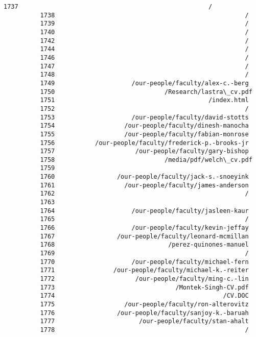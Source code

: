 \documentclass[11pt]{article}
\begin{document}
\begin{Verbatim}[commandchars=\\\{\}]
          1737                                                    /
          1738                                                    /
          1739                                                    /
          1740                                                    /
          1742                                                    /
          1744                                                    /
          1746                                                    /
          1747                                                    /
          1748                                                    /
          1749                     /our-people/faculty/alex-c.-berg
          1750                              /Research/lastra\_cv.pdf
          1751                                          /index.html
          1752                                                    /
          1753                     /our-people/faculty/david-stotts
          1754                   /our-people/faculty/dinesh-manocha
          1755                   /our-people/faculty/fabian-monrose
          1756           /our-people/faculty/frederick-p.-brooks-jr
          1757                      /our-people/faculty/gary-bishop
          1758                              /media/pdf/welch\_cv.pdf
          1759                                                     
          1760                 /our-people/faculty/jack-s.-snoeyink
          1761                   /our-people/faculty/james-anderson
          1762                                                    /
          1763                                                     
          1764                     /our-people/faculty/jasleen-kaur
          1765                                                    /
          1766                     /our-people/faculty/kevin-jeffay
          1767                 /our-people/faculty/leonard-mcmillan
          1768                               /perez-quinones-manuel
          1769                                                    /
          1770                     /our-people/faculty/michael-fern
          1771                /our-people/faculty/michael-k.-reiter
          1772                      /our-people/faculty/ming-c.-lin
          1773                                 /Montek-Singh-CV.pdf
          1774                                              /CV.DOC
          1775                   /our-people/faculty/ron-alterovitz
          1776                 /our-people/faculty/sanjoy-k.-baruah
          1777                       /our-people/faculty/stan-ahalt
          1778                                                    /

\end{Verbatim}
\end{document}
